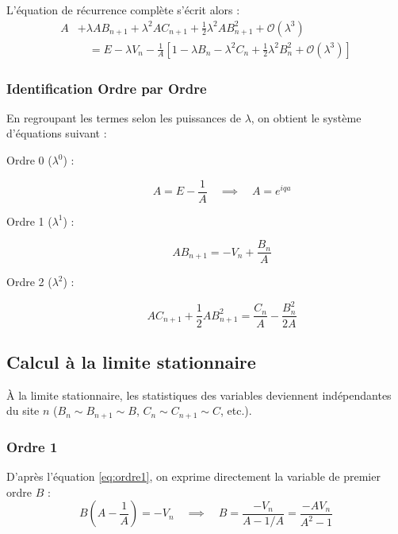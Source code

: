 L'équation de récurrence complète s'écrit alors :
\begin{align*}
    A &+ \lambda A B_{n+1} + \lambda^2 A C_{n+1} + \frac{1}{2}\lambda^2 A B_{n+1}^2 + \mathcal{O}(\lambda^3) \nonumber \\
    &\quad = E - \lambda V_n - \frac{1}{A} \left[ 1 - \lambda B_n - \lambda^2 C_n + \frac{1}{2}\lambda^2 B_n^2 + \mathcal{O}(\lambda^3) \right]
\end{align*}

\subsubsection{Identification Ordre par Ordre}

En regroupant les termes selon les puissances de $\lambda$, on obtient le système d'équations suivant :
\begin{description}
    \item[Ordre 0 ($\lambda^0$) :]
    \begin{equation}
        A = E - \frac{1}{A} \quad \implies \quad A = e^{iqa} \label{eq:ordre0}
    \end{equation}
    \item[Ordre 1 ($\lambda^1$) :]
    \begin{equation}
        A B_{n+1} = -V_n + \frac{B_n}{A} \label{eq:ordre1}
    \end{equation}
    \item[Ordre 2 ($\lambda^2$) :]
    \begin{equation}
        A C_{n+1} + \frac{1}{2}A B_{n+1}^2 = \frac{C_n}{A} - \frac{B_n^2}{2A} \label{eq:ordre2}
    \end{equation}
\end{description}

\subsection{Calcul à la limite stationnaire}

À la limite stationnaire, les statistiques des variables deviennent indépendantes du site $n$ ($B_n \sim B_{n+1} \sim B$, $C_n \sim C_{n+1} \sim C$, etc.).

\subsubsection{Ordre 1}
D'après l'équation \eqref{eq:ordre1}, on exprime directement la variable de premier ordre $B$ :
\begin{equation*}
    B \left( A - \frac{1}{A} \right) = -V_n \quad \implies \quad B = \frac{-V_n}{A - 1/A} = \frac{-A V_n}{A^2 - 1}
\end{equation*}

